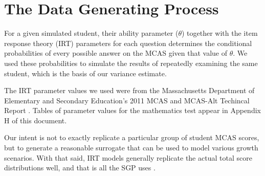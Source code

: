 \documentclass[reqno,12pt]{amsart}
\theoremstyle{plain}
\numberwithin{equation}{section} %
\numberwithin{figure}{section} %
\theoremstyle{remark}
\begin{document}
\section{The Data Generating Process}

For a given simulated student, their ability parameter ($\theta$) together with the item response theory (IRT) parameters for each question determines the conditional probabilities of every possible answer on the MCAS given that value of $\theta$. We used these probabilities to simulate the results of repeatedly examining the same student, which is the basis of our variance estimate. 
\par\vspace{0.3 cm}
The IRT parameter values we used were from the Massachusetts Department of Elementary and Secondary Education's 2011 MCAS and MCAS-Alt Techincal Report \cite{mctr}.  Tables of parameter values for the mathematics test appear in Appendix H of this document.  
\par\vspace{0.3 cm}
Our intent is not to exactly replicate a particular group of student MCAS scores, but to generate a reasonable surrogate that can be used to model various growth scenarios.  With that said, IRT models generally replicate the actual total score distributions well, and that is all the SGP uses \cite{dnt1}.

\par\vspace{0.3 cm}
\end{document}
